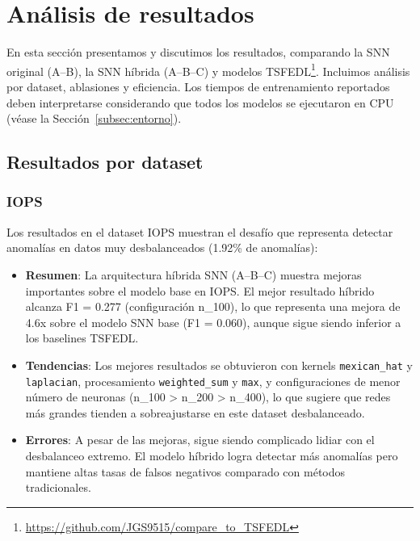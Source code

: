 \section{Análisis de resultados}

En esta sección presentamos y discutimos los resultados, comparando la SNN original (A--B), la SNN híbrida (A--B--C) y modelos TSFEDL\footnote{\url{https://github.com/JGS9515/compare_to_TSFEDL}}. Incluimos análisis por dataset, ablasiones y eficiencia. Los tiempos de entrenamiento reportados deben interpretarse considerando que todos los modelos se ejecutaron en CPU (véase la Sección~\ref{subsec:entorno}).

\subsection{Resultados por dataset}

\subsubsection{IOPS}
Los resultados en el dataset IOPS muestran el desafío que representa detectar anomalías en datos muy desbalanceados (1.92\% de anomalías):
\begin{itemize}
    \item \textbf{Resumen}: La arquitectura híbrida SNN (A--B--C) muestra mejoras importantes sobre el modelo base en IOPS. El mejor resultado híbrido alcanza F1 = 0.277 (configuración n\_100), lo que representa una mejora de 4.6x sobre el modelo SNN base (F1 = 0.060), aunque sigue siendo inferior a los baselines TSFEDL.
    \item \textbf{Tendencias}: Los mejores resultados se obtuvieron con kernels \texttt{mexican\_hat} y \texttt{laplacian}, procesamiento \texttt{weighted\_sum} y \texttt{max}, y configuraciones de menor número de neuronas (n\_100 > n\_200 > n\_400), lo que sugiere que redes más grandes tienden a sobreajustarse en este dataset desbalanceado.
    \item \textbf{Errores}: A pesar de las mejoras, sigue siendo complicado lidiar con el desbalanceo extremo. El modelo híbrido logra detectar más anomalías pero mantiene altas tasas de falsos negativos comparado con métodos tradicionales.
\end{itemize}


